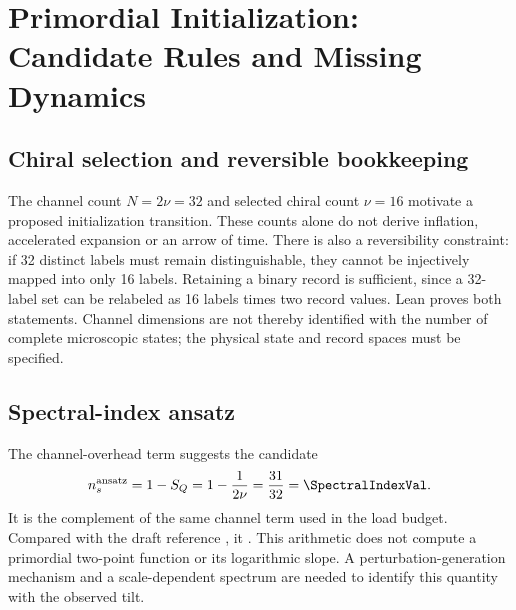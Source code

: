 
\section{Primordial Initialization: Candidate Rules and Missing Dynamics}
\subsection{Chiral selection and reversible bookkeeping}
The channel count $N=2\nu=32$ and selected chiral count $\nu=16$ motivate a proposed initialization transition. These counts alone do not derive inflation, accelerated expansion or an arrow of time. There is also a reversibility constraint: if 32 distinct labels must remain distinguishable, they cannot be injectively mapped into only 16 labels. Retaining a binary record is sufficient, since a 32-label set can be relabeled as 16 labels times two record values. Lean proves both statements. Channel dimensions are not thereby identified with the number of complete microscopic states; the physical state and record spaces must be specified.

\subsection{Spectral-index ansatz}
The channel-overhead term suggests the candidate
\begin{equation}
n_s^{\rm ansatz}=1-S_Q=1-\frac{1}{2\nu}=\frac{31}{32}=\SpectralIndexVal.
\end{equation}
It is the complement of the same channel term used in the load budget. Compared with the draft reference \SpectralIndexExperimentalValue, it \SpectralIndexAccText. This arithmetic does not compute a primordial two-point function or its logarithmic slope. A perturbation-generation mechanism and a scale-dependent spectrum are needed to identify this quantity with the observed tilt.

